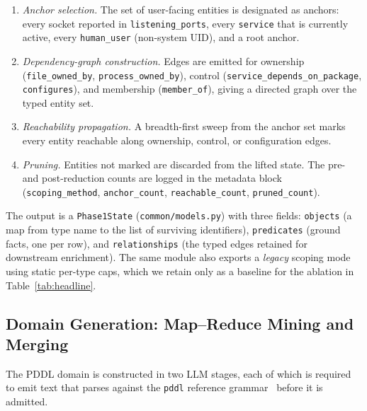 \begin{enumerate}
  \item \emph{Anchor selection.} The set of user-facing entities is designated as anchors: every socket reported in \texttt{listening\_ports}, every \texttt{service} that is currently active, every \texttt{human\_user} (non-system UID), and a root anchor.
  \item \emph{Dependency-graph construction.} Edges are emitted for ownership (\texttt{file\_owned\_by}, \texttt{process\_owned\_by}), control (\texttt{service\_depends\_on\_package}, \texttt{configures}), and membership (\texttt{member\_of}), giving a directed graph over the typed entity set.
  \item \emph{Reachability propagation.} A breadth-first sweep from the anchor set marks every entity reachable along ownership, control, or configuration edges.
  \item \emph{Pruning.} Entities not marked are discarded from the lifted state. The pre- and post-reduction counts are logged in the metadata block (\texttt{scoping\_method}, \texttt{anchor\_count}, \texttt{reachable\_count}, \texttt{pruned\_count}).
\end{enumerate}

The output is a \texttt{Phase1State} (\texttt{common/models.py}) with three fields: \texttt{objects} (a map from type name to the list of surviving identifiers), \texttt{predicates} (ground facts, one per row), and \texttt{relationships} (the typed edges retained for downstream enrichment). The same module also exports a \emph{legacy} scoping mode using static per-type caps, which we retain only as a baseline for the ablation in Table~\ref{tab:headline}.

\subsection{Domain Generation: Map--Reduce Mining and Merging}
\label{app:domain}

The PDDL domain is constructed in two LLM stages, each of which is required to emit text that parses against the \texttt{pddl} reference grammar~\cite{pddllib} before it is admitted.

